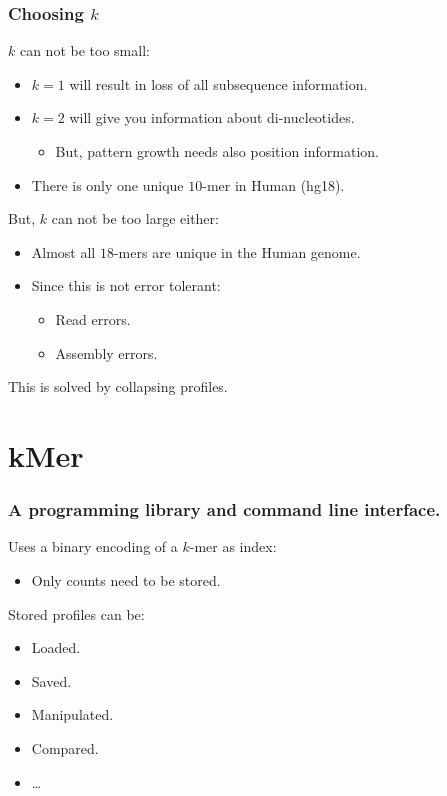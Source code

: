 \documentclass[slidestop]{beamer}
\begin{document}
\begin{frame}
  \frametitle{Choosing $k$}

  $k$ can not be too small:
  \begin{itemize}
    \item $k = 1$ will result in loss of all subsequence information.
    \item $k = 2$ will give you information about di-nucleotides.
    \begin{itemize}
      \item But, pattern growth needs also position information.
    \end{itemize}
    \item There is only one unique $10$-mer in Human (hg18).
  \end{itemize}
  \bigskip
  \pause

  But, $k$ can not be too large either:
  \begin{itemize}
    \item Almost all $18$-mers are unique in the Human genome.
    \item Since this is not error tolerant:
    \begin{itemize}
      \item Read errors.
      \item Assembly errors.
    \end{itemize}
  \end{itemize}
  \bigskip
  \pause

  This is solved by collapsing profiles.
\end{frame}

\section{kMer}
\begin{fframe}
  \frametitle{A programming library and command line interface.}

  Uses a binary encoding of a $k$-mer as index:
  \begin{itemize}
    \item Only counts need to be stored.
  \end{itemize}
  \bigskip
  \pause

  Stored profiles can be:
  \begin{itemize}
    \item Loaded.
    \item Saved.
    \item Manipulated.
    \item Compared.
    \item \ldots
  \end{itemize}

  \vfill
  {
  }
\end{fframe}
\end{document}
